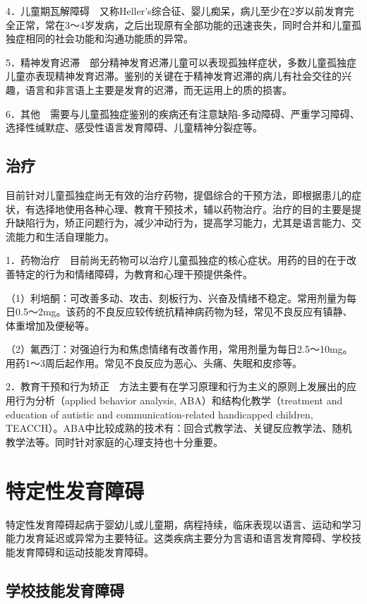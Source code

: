 4．儿童期瓦解障碍　又称Heller's综合征、婴儿痴呆，病儿至少在2岁以前发育完全正常，常在3～4岁发病，之后出现原有全部功能的迅速丧失，同时合并和儿童孤独症相同的社会功能和沟通功能质的异常。

5．精神发育迟滞　部分精神发育迟滞儿童可以表现孤独样症状，多数儿童孤独症儿童亦表现精神发育迟滞。鉴别的关键在于精神发育迟滞的病儿有社会交往的兴趣，语言和非言语上主要是发育的迟滞，而无运用上的质的损害。

6．其他　需要与儿童孤独症鉴别的疾病还有注意缺陷-多动障碍、严重学习障碍、选择性缄默症、感受性语言发育障碍、儿童精神分裂症等。

\subsection{治疗}

目前针对儿童孤独症尚无有效的治疗药物，提倡综合的干预方法，即根据患儿的症状，有选择地使用各种心理、教育干预技术，辅以药物治疗。治疗的目的主要是提升缺陷行为，矫正问题行为，减少冲动行为，提高学习能力，尤其是语言能力、交流能力和生活自理能力。

1．药物治疗　目前尚无药物可以治疗儿童孤独症的核心症状。用药的目的在于改善特定的行为和情绪障碍，为教育和心理干预提供条件。

（1）利培酮：可改善多动、攻击、刻板行为、兴奋及情绪不稳定。常用剂量为每日0.5～2mg。该药的不良反应较传统抗精神病药物为轻，常见不良反应有镇静、体重增加及便秘等。

（2）氟西汀：对强迫行为和焦虑情绪有改善作用，常用剂量为每日2.5～10mg。用药1～3周后起作用。常见不良反应为恶心、头痛、失眠和皮疹等。

2．教育干预和行为矫正　方法主要有在学习原理和行为主义的原则上发展出的应用行为分析（applied
behavior analysis, ABA）和结构化教学（treatment and education of
autistic and communication-related handicapped children,
TEACCH）。ABA中比较成熟的技术有：回合式教学法、关键反应教学法、随机教学法等。同时针对家庭的心理支持也十分重要。


\section{特定性发育障碍}

特定性发育障碍起病于婴幼儿或儿童期，病程持续，临床表现以语言、运动和学习能力发育延迟或异常为主要特征。这类疾病主要分为言语和语言发育障碍、学校技能发育障碍和运动技能发育障碍。

\subsection{学校技能发育障碍}

